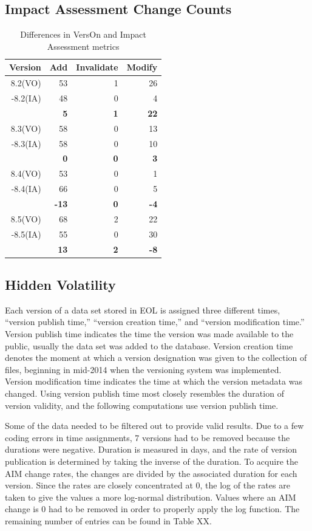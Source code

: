 \subsection{Impact Assessment Change Counts}
\begin{table}
	\caption{Differences in VersOn and Impact Assessment metrics}
	\label{table:GCMD_metric}
	\centering
	\begin{tabular}{|r|r|r|r|}
		\hline
		Version & Add & Invalidate & Modify\\ \hline
		8.2(VO)&	53&	1&	26\\
		-8.2(IA)&	48&	0&	4\\
		\hline
		&	\textbf{5}&	\textbf{1}&	\textbf{22}\\
		\hline
		8.3(VO)&	58&	0&	13\\
		-8.3(IA)&	58&	0&	10\\
		\hline
		&	\textbf{0}&	\textbf{0}&	\textbf{3}\\
		\hline
		8.4(VO)&	53&	0&	1\\
		-8.4(IA)&	66&	0&	5\\
		\hline
		&	\textbf{-13}&	\textbf{0}&	\textbf{-4}\\
		\hline
		8.5(VO)&	68&	2&	22\\
		-8.5(IA)&	55&	0&	30\\
		\hline
		&	\textbf{13}&	\textbf{2}&	\textbf{-8}\\						
		\hline
	\end{tabular}
\end{table}

\subsection{Hidden Volatility}

Each version of a data set stored in EOL is assigned three different times, “version publish time,” “version creation time,” and “version modification time.”  
Version publish time indicates the time the version was made available to the public, usually the data set was added to the database.  
Version creation time denotes the moment at which a version designation was given to the collection of files, beginning in mid-2014 when the versioning system was implemented.  
Version modification time indicates the time at which the version metadata was changed.  
Using version publish time most closely resembles the duration of version validity, and the following computations use version publish time.

Some of the data needed to be filtered out to provide valid results.  
Due to a few coding errors in time assignments, 7 versions had to be removed because the durations were negative.  
Duration is measured in days, and the rate of version publication is determined by taking the inverse of the duration.  
To acquire the AIM change rates, the changes are divided by the associated duration for each version.  
Since the rates are closely concentrated at 0, the log of the rates are taken to give the values a more log-normal distribution.  
Values where an AIM change is 0 had to be removed in order to properly apply the log function.  
The remaining number of entries can be found in Table XX.

